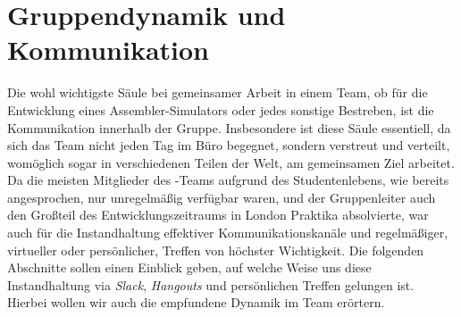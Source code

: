 
\vspace{-0.6cm}
\section{Gruppendynamik und Kommunikation}
\label{team:group}
\vspace{-0.5cm}

Die wohl wichtigste Säule bei gemeinsamer Arbeit in einem Team, ob für die
Entwicklung eines Assembler-Simulators oder jedes sonstige Bestreben, ist die
Kommunikation innerhalb der Gruppe. Insbesondere ist diese Säule essentiell,
da sich das Team nicht jeden Tag im Büro begegnet, sondern verstreut und
verteilt, womöglich sogar in verschiedenen Teilen der Welt, am gemeinsamen Ziel
arbeitet. Da die meisten Mitglieder des \erasim{}-Teams aufgrund des
Studentenlebens, wie bereits angesprochen, nur unregelmäßig verfügbar waren, und
der Gruppenleiter auch den Großteil des Entwicklungszeitraums in London Praktika
absolvierte, war auch für \erasim{} die Instandhaltung effektiver
Kommunikationskanäle und regelmäßiger, virtueller oder persönlicher, Treffen von
höchster Wichtigkeit. Die folgenden Abschnitte sollen einen Einblick geben, auf
welche Weise uns diese Instandhaltung via \emph{Slack}, \emph{Hangouts} und
persönlichen Treffen gelungen ist. Hierbei wollen wir auch die empfundene
Dynamik im Team erörtern.





